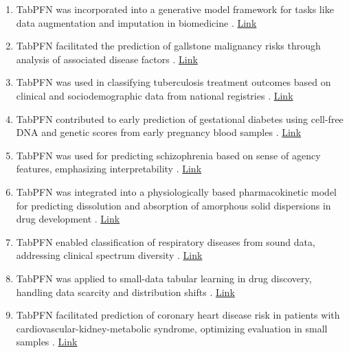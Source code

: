 \begin{enumerate}
\item TabPFN was incorporated into a generative model framework for tasks like data augmentation and imputation in biomedicine \cite{hc_usecase21_tabpfgen}. \href{https://arxiv.org/abs/2406.05216}{Link}

\item TabPFN facilitated the prediction of gallstone malignancy risks through analysis of associated disease factors \cite{hc_usecase22_gallstone_malignancy_tabpfn}. \href{https://www.mdpi.com/2077-0383/14/17/6091}{Link}

\item TabPFN was used in classifying tuberculosis treatment outcomes based on clinical and sociodemographic data from national registries \cite{hc_usecase23_tb_outcomes_tabpfn}. \href{https://www.researchsquare.com/article/rs-7502054/v1}{Link}

\item TabPFN contributed to early prediction of gestational diabetes using cell-free DNA and genetic scores from early pregnancy blood samples \cite{hc_usecase24_gdm_cfdna_tabpfn}. \href{https://www.medrxiv.org/content/10.1101/2025.09.03.25334985v1}{Link}

\item TabPFN was used for predicting schizophrenia based on sense of agency features, emphasizing interpretability \cite{hc_usecase25_schizophrenia_soa_tabpfn}. \href{https://www.sciencedirect.com/science/article/abs/pii/S187620182500317X}{Link}

\item TabPFN was integrated into a physiologically based pharmacokinetic model for predicting dissolution and absorption of amorphous solid dispersions in drug development \cite{hc_usecase26_pbpk_asd_tabpfn}. \href{https://doi.org/10.1016/j.jconrel.2025.114123}{Link}

\item TabPFN enabled classification of respiratory diseases from sound data, addressing clinical spectrum diversity \cite{hc_usecase27_respiratory_sounds_tabpfn}. \href{https://papers.ssrn.com/sol3/papers.cfm?abstract_id=5529540}{Link}

\item TabPFN was applied to small-data tabular learning in drug discovery, handling data scarcity and distribution shifts \cite{hc_usecase28_drug_discovery_small_data_tabpfn}. \href{https://chemrxiv.org/engage/chemrxiv/article-details/68d29b1cf2aff1677025b18f}{Link}

\item TabPFN facilitated prediction of coronary heart disease risk in patients with cardiovascular-kidney-metabolic syndrome, optimizing evaluation in small samples \cite{hc_usecase29_ckm_chd_tabpfn}. \href{https://pmc.ncbi.nlm.nih.gov/articles/PMC12437168/}{Link}


\end{enumerate}
